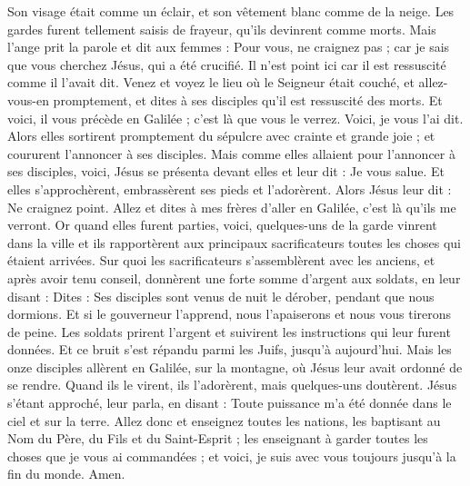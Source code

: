 \begin{multicols}{2}
Son visage était comme un éclair, et son vêtement blanc comme de la neige.
Les gardes furent tellement saisis de frayeur, qu'ils devinrent comme morts.
Mais l'ange prit la parole et dit aux femmes : Pour vous, ne craignez pas ; car je sais que vous cherchez Jésus, qui a été crucifié.
Il n'est point ici car il est ressuscité comme il l'avait dit. Venez et voyez le lieu où le Seigneur était couché,
et allez-vous-en promptement, et dites à ses disciples qu'il est ressuscité des morts. Et voici, il vous précède en Galilée ; c'est là que vous le verrez. Voici, je vous l'ai dit.
Alors elles sortirent promptement du sépulcre avec crainte et grande joie ; et coururent l'annoncer à ses disciples.
Mais comme elles allaient pour l'annoncer à ses disciples, voici, Jésus se présenta devant elles et leur dit : Je vous salue. Et elles s'approchèrent, embrassèrent ses pieds et l'adorèrent.
Alors Jésus leur dit : Ne craignez point. Allez et dites à mes frères d'aller en Galilée, c'est là qu'ils me verront.
 Or quand elles furent parties, voici, quelques-uns de la garde vinrent dans la ville et ils rapportèrent aux principaux sacrificateurs toutes les choses qui étaient arrivées.
Sur quoi les sacrificateurs s'assemblèrent avec les anciens, et après avoir tenu conseil, donnèrent une forte somme d'argent aux soldats,
en leur disant : Dites : Ses disciples sont venus de nuit le dérober, pendant que nous dormions.
Et si le gouverneur l'apprend, nous l'apaiserons et nous vous tirerons de peine.
Les soldats prirent l'argent et suivirent les instructions qui leur furent données. Et ce bruit s'est répandu parmi les Juifs, jusqu'à aujourd'hui.
Mais les onze disciples allèrent en Galilée, sur la montagne, où Jésus leur avait ordonné de se rendre.
Quand ils le virent, ils l'adorèrent, mais quelques-uns doutèrent.
Jésus s'étant approché, leur parla, en disant : Toute puissance m'a été donnée dans le ciel et sur la terre.
Allez donc et enseignez toutes les nations, les baptisant au Nom du Père, du Fils et du Saint-Esprit ;
les enseignant à garder toutes les choses que je vous ai commandées ; et voici, je suis avec vous toujours jusqu'à la fin du monde. Amen.
\PPE{}
\end{multicols}
